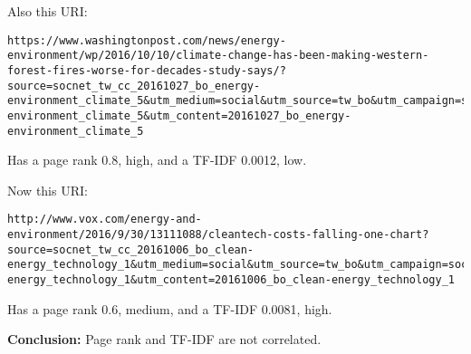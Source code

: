\documentclass[a4paper, 11pt]{article}
\begin{document}
Also this URI:
\begin{lstlisting}[breakatwhitespace=〈false)] 
https://www.washingtonpost.com/news/energy-environment/wp/2016/10/10/climate-change-has-been-making-western-forest-fires-worse-for-decades-study-says/?source=socnet_tw_cc_20161027_bo_energy-environment_climate_5&utm_medium=social&utm_source=tw_bo&utm_campaign=socnet_tw_cc_20161027_bo_energy-environment_climate_5&utm_content=20161027_bo_energy-environment_climate_5 
\end{lstlisting}
Has a page rank 0.8, high, and a TF-IDF 0.0012, low.


Now this URI:
\begin{lstlisting}[breakatwhitespace=〈false)] 
http://www.vox.com/energy-and-environment/2016/9/30/13111088/cleantech-costs-falling-one-chart?source=socnet_tw_cc_20161006_bo_clean-energy_technology_1&utm_medium=social&utm_source=tw_bo&utm_campaign=socnet_tw_cc_20161006_bo_clean-energy_technology_1&utm_content=20161006_bo_clean-energy_technology_1
\end{lstlisting}
Has a page rank 0.6, medium, and a TF-IDF 0.0081, high.



\textbf{Conclusion:}
Page rank and TF-IDF are not correlated.
\end{document}
